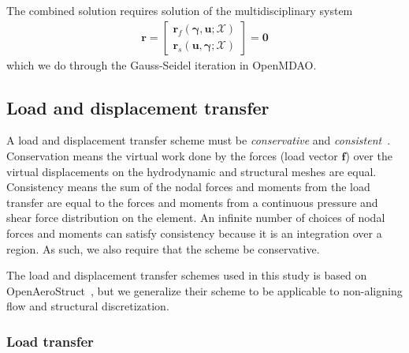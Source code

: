 \documentclass[10pt]{article}
\newcommand{\mb}[1]{\boldsymbol{\mathbf{#1}}} %
\newcommand{\mbf}[1]{\mathbf{#1}}
\newcommand{\mbs}[1]{\boldsymbol{#1}}
\newcommand{\mcal}[1]{\mathcal{#1}} %
\newcommand{\beq}{\begin{equation}\begin{aligned}}
\newcommand{\eeq}{\end{aligned}\end{equation}}
\begin{document}
The combined solution requires solution of the multidisciplinary system
\beq
\mbf{r} = \begin{bmatrix}
	\mbf{r}_f(\mbs{\gamma}, \mbf{u}; \mcal{X}) \\
	\mbf{r}_s(\mbf{u}, \mbs{\gamma}; \mcal{X})
\end{bmatrix}
=
\mbf{0}
\eeq
which we do through the Gauss-Seidel iteration in OpenMDAO. %

\subsection{Load and displacement transfer}

A load and displacement transfer scheme must be \emph{conservative} and \emph{consistent}~\cite{Martins2005c}.
Conservation means the virtual work done by the forces (load vector $\mb{f}$) over the virtual displacements on the hydrodynamic and structural meshes are equal.
Consistency means the sum of the nodal forces and moments from the load transfer are equal to the forces and moments from a continuous pressure and shear force distribution on the element.
An infinite number of choices of nodal forces and moments can satisfy consistency because it is an integration over a region.
As such, we also require that the scheme be conservative.

The load and displacement transfer schemes used in this study is based on OpenAeroStruct~\cite{Jasa2018a}, but we generalize their scheme to be applicable to non-aligning flow and structural discretization.

\subsubsection{Load transfer}
\end{document}
